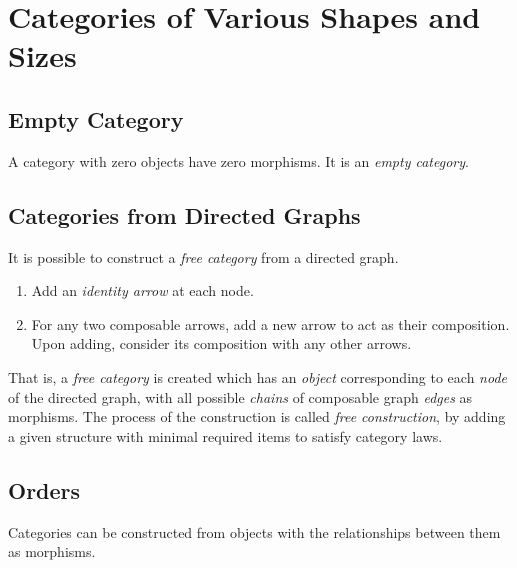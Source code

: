 \section{Categories of Various Shapes and Sizes}

\subsection{Empty Category}

\begin{definition}
    A category with zero objects have zero morphisms. It is an \textit{empty category}.
\end{definition}

\subsection{Categories from Directed Graphs}

\begin{definition}
    It is possible to construct a \textit{free category} from a directed graph.
    \begin{enumerate}
        \item Add an \textit{identity arrow} at each node.
        \item For any two composable arrows, add a new arrow to act as their composition. Upon adding, consider its composition with any other arrows.
    \end{enumerate}
    
    That is, a \textit{free category} is created which has an \textit{object} corresponding to each \textit{node} of the directed graph, with all possible \textit{chains} of composable graph \textit{edges} as morphisms. The process of the construction is called \textit{free construction}, by adding a given structure with minimal required items to satisfy category laws.
\end{definition}

\subsection{Orders}

\begin{definition}
    Categories can be constructed from objects with the relationships between them as morphisms.
\end{definition}

